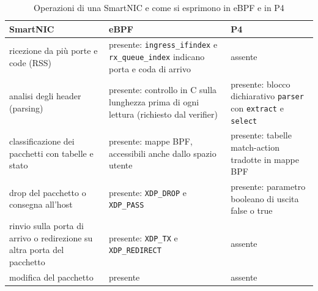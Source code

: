 \begin{table}[H]
    \centering
    \footnotesize
    \begin{tabular}{@{}>{\raggedright\arraybackslash}p{3.7cm}>{\raggedright\arraybackslash}p{5.1cm}>{\raggedright\arraybackslash}p{5.1cm}@{}}
        \toprule
        \textbf{SmartNIC} & \textbf{eBPF} & \textbf{P4} \\
        \midrule
        ricezione da più porte e code (RSS) & presente: \texttt{ingress\_ifindex} e \texttt{rx\_queue\_index} indicano porta e coda di arrivo & assente \\
        \addlinespace
        analisi degli header (parsing) & presente: controllo in C sulla lunghezza prima di ogni lettura (richiesto dal verifier) & presente: blocco dichiarativo \texttt{parser} con \texttt{extract} e \texttt{select} \\
        \addlinespace
        classificazione dei pacchetti con tabelle e stato & presente: mappe BPF, accessibili anche dallo spazio utente & presente: tabelle match-action tradotte in mappe BPF \\
        \addlinespace
        drop del pacchetto o consegna all'host & presente: \texttt{XDP\_DROP} e \texttt{XDP\_PASS} & presente: parametro booleano di uscita false o true \\
        \addlinespace
        rinvio sulla porta di arrivo o redirezione su altra porta del pacchetto & presente: \texttt{XDP\_TX} e \texttt{XDP\_REDIRECT} & assente \\
        \addlinespace
        modifica del pacchetto & presente & assente \\
        \bottomrule
    \end{tabular}
    \caption{Operazioni di una SmartNIC e come si esprimono in eBPF e in P4}
    \label{tab:punti-comuni}
\end{table}

